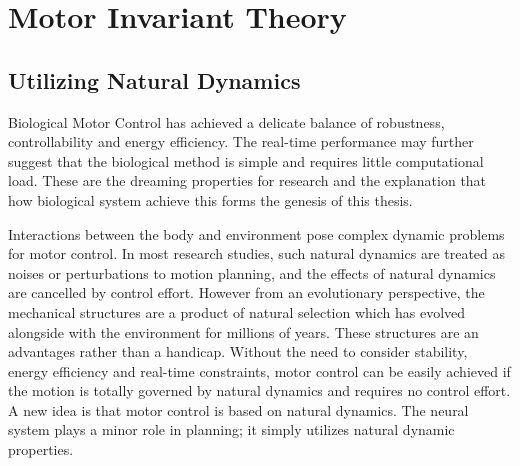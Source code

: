 %

\section{Motor Invariant Theory}
\subsection{Utilizing Natural Dynamics}
Biological Motor Control has achieved a delicate balance of robustness, controllability and energy efficiency.
The real-time performance may further suggest that the biological method  is simple and requires little computational load.
These are the dreaming properties for \cms research and  the explanation that how biological system achieve this  forms the genesis of this thesis.



Interactions between the body and environment pose  complex dynamic problems for motor control.
In most \cms research studies, such natural dynamics are treated as noises or perturbations to motion planning, and the  effects  of natural dynamics are cancelled by control effort.
However from an evolutionary perspective, the mechanical structures are a product of natural selection which has evolved alongside with the environment for millions of years. 
These structures are an advantages rather than a handicap. 
Without the need to consider stability, energy efficiency and real-time constraints, motor control can be easily achieved if the motion is totally governed by natural dynamics and requires no control effort.
A new idea is that motor control is based on natural dynamics.
The neural system plays a minor role in planning; it simply utilizes natural dynamic properties.


